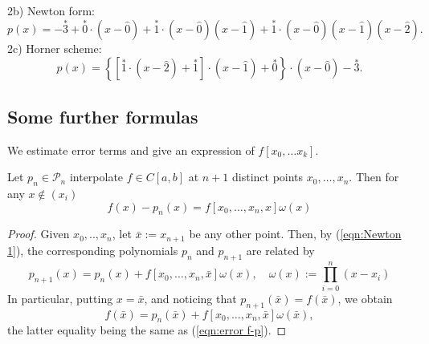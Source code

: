 \documentclass[a4paper]{article}
\begin{document}
\begin{center}
\end{center}
2b) Newton form:
$$
p(x)=-\overset{*}{3}+\overset{*}{0} \cdot(x-\widehat{0})+\overset{*}{1} \cdot(x-\widehat{0})(x-\widehat{1})+\overset{*}{1} \cdot(x-\widehat{0})(x-\widehat{1})(x-\widehat{2}) .
$$
2c) Horner scheme:
$$
p(x)=\left\{[\overset{*}{1} \cdot(x-\widehat{2})+\overset{*}{1}] \cdot(x-\widehat{1})+\overset{*}{0}\right\} \cdot(x-\widehat{0})-\overset{*}{3}.
$$
\subsection{Some further formulas}
We estimate error terms and give an expression of $ f[x_0, \dots x_k] $. 
\begin{theorem}
    Let $p_{n} \in \mathcal{P}_{n}$ interpolate $f \in C[a, b]$ at $n+1$ distinct points $x_{0}, \ldots, x_{n}$. Then for any $x \notin\left(x_{i}\right)$
    \begin{equation}\label{eqn:error f-p}
        f(x)-p_{n}(x)=f[x_{0}, \ldots, x_{n}, x] \omega(x)
    \end{equation}
\end{theorem}
\begin{proof}
    Given $x_{0}, . ., x_{n}$, let $\bar{x}:=x_{n+1}$ be any other point. Then, by (\ref{eqn:Newton 1}), the corresponding polynomials $p_{n}$ and $p_{n+1}$ are related by
    $$
    p_{n+1}(x)=p_{n}(x)+f\left[x_{0}, \ldots, x_{n}, \bar{x}\right] \omega(x), \quad \omega(x):=\prod_{i=0}^{n}\left(x-x_{i}\right)
    $$
    In particular, putting $x=\bar{x}$, and noticing that $p_{n+1}(\bar{x})=f(\bar{x})$, we obtain
    $$
    f(\bar{x})=p_{n}(\bar{x})+f\left[x_{0}, \ldots, x_{n}, \bar{x}\right] \omega(\bar{x}),
    $$
    the latter equality being the same as (\ref{eqn:error f-p}).
\end{proof}
\end{document}
